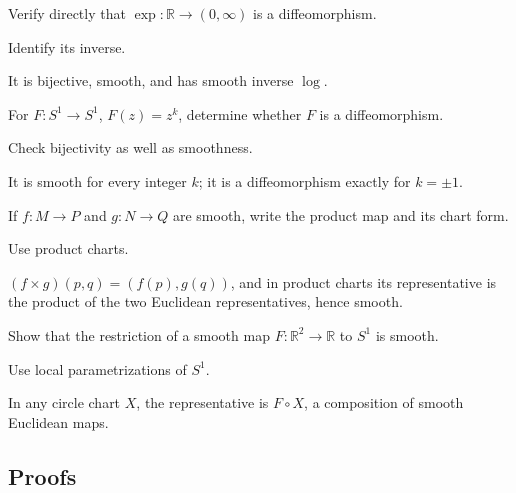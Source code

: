 \begin{exercise}\label{exr:vii03-ped-02}
Verify directly that \(\exp:\mathbb R\to(0,\infty)\) is a diffeomorphism.
\end{exercise}
\begin{hint}
Identify its inverse.
\end{hint}
\begin{solution}
It is bijective, smooth, and has smooth inverse \(\log\).
\end{solution}

\begin{exercise}\label{exr:vii03-ped-03}
For \(F:S^1\to S^1\), \(F(z)=z^k\), determine whether \(F\) is a diffeomorphism.
\end{exercise}
\begin{hint}
Check bijectivity as well as smoothness.
\end{hint}
\begin{solution}
It is smooth for every integer \(k\); it is a diffeomorphism exactly for \(k=\pm1\).
\end{solution}

\begin{exercise}\label{exr:vii03-ped-04}
If \(f:M\to P\) and \(g:N\to Q\) are smooth, write the product map and its chart form.
\end{exercise}
\begin{hint}
Use product charts.
\end{hint}
\begin{solution}
\((f\times g)(p,q)=(f(p),g(q))\), and in product charts its representative is the product of the two Euclidean representatives, hence smooth.
\end{solution}

\begin{exercise}[Restriction]\label{exr:vii03-ped-05}
Show that the restriction of a smooth map \(F:\mathbb R^2\to\mathbb R\) to \(S^1\) is smooth.
\end{exercise}
\begin{hint}
Use local parametrizations of \(S^1\).
\end{hint}
\begin{solution}
In any circle chart \(X\), the representative is \(F\circ X\), a composition of smooth Euclidean maps.
\end{solution}

\subsection*{Proofs}

